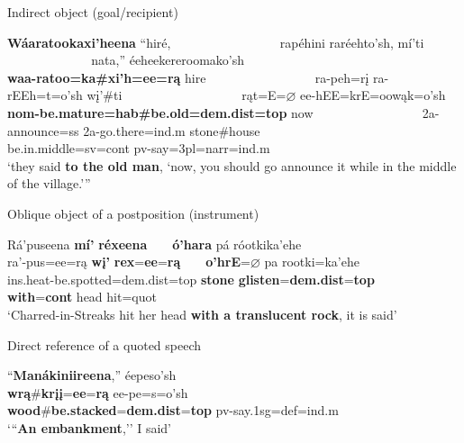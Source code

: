 \begin{exe}
\begin{xlist}
    
\item\label{NAexamplesD} Indirect object (goal/recipient)

    \glll \textbf{Wáaratookaxi'heena} ``hiré, ~ ~ ~ ~ ~ ~ ~ ~ ~ ~ rapéhini raréehto'sh, mí'ti ~ ~ ~ ~ ~ ~ ~ ~ ~ ~ ~ nata,'' éeheekereroomako'sh\\
    \textbf{waa-ratoo=ka\#xi'h=ee=rą} hire ~ ~ ~ ~ ~ ~ ~ ~ ~ ~ ra-peh=rį ra-rEEh=t=o'sh wį'\#ti ~ ~ ~ ~ ~ ~ ~ ~ ~ ~ ~ rąt=E=$\varnothing$ ee-hEE=krE=oowąk=o'sh\\
    \textbf{nom-\textnormal{\bfseries be.mature}=hab\#\textnormal{\bfseries be.old}=dem.dist=top} \textnormal{now} ~ ~ ~ ~ ~ ~ ~ ~ ~ ~ 2a-\textnormal{announce}=ss 2a-\textnormal{go.there}=ind.m \textnormal{stone}\#\textnormal{house} ~ ~ ~ ~ ~ ~ ~ ~ ~ ~ ~ \textnormal{be.in.middle}=sv=cont pv-\textnormal{say}=3pl=narr=ind.m\\
    \glt `they said \textbf{to the old man}, `now, you should go announce it while in the middle of the village.'{''} \citep[208]{hollow1973b}
    
\item\label{NAexamplesE} Oblique object of a postposition (instrument)

    \glll Rá'puseena \textbf{mí'} \textbf{réxeena} ~ ~ \textbf{ó'hara} pá róotkika'ehe\\
    ra'-pus=ee=rą \textbf{wį'} \textbf{rex}=\textbf{ee}=\textbf{rą} ~ ~ \textbf{o'hrE}=\textbf{$\varnothing$} pa rootki=ka'ehe\\
    ins.heat-\textnormal{be.spotted}=dem.dist=top \textnormal{\bfseries stone} \textnormal{\bfseries glisten}=\textbf{dem.dist}=\textbf{top} ~ ~ \textnormal{\bfseries with}=\textbf{cont} \textnormal{head} \textnormal{hit}=quot\\
    \glt `Charred-in-Streaks hit her head \textbf{with a translucent rock}, it is said' \citep[36]{kennard1936}
    
\item\label{NAexamplesF} Direct reference of a quoted speech

    \glll ``\textbf{Manákiniireena},'' éepeso'sh\\
    \textbf{wrą}\#\textbf{krįį}=\textbf{ee}=\textbf{rą} ee-pe=s=o'sh\\
    \textnormal{\bfseries wood}\#\textnormal{\bfseries be.stacked}=\textbf{dem.dist}=\textbf{top} pv-\textnormal{say}.1sg=def=ind.m\\
    \glt `{``}\textbf{An embankment},'' I said' \citep[37]{kennard1936}


\end{xlist}
\end{exe}
